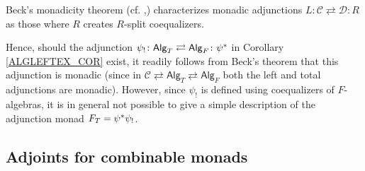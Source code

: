 \documentclass[a4paper,10pt
,draft
]{article}%
\renewcommand{\1}{\eta}%
\newcommand{\Alg}{\mathsf{Alg}}
\begin{document}


\begin{remark}\label{ADJSRMON REM}
Beck's monadicity theorem (cf. \cite[VI.7 Thm. 1]{McL},\cite[Thm. 5.5.1]{Ri17})
characterizes monadic adjunctions $L\colon \mathcal{C} \rightleftarrows \mathcal{D}\colon R$
as those where $R$ creates $R$-split coequalizers. 

Hence, should the adjunction 
$\psi_! \colon \Alg_T \rightleftarrows \Alg_F \colon \psi^{\**}$
in Corollary \ref{ALGLEFTEX_COR} exist,
it readily follows from Beck's theorem that this adjunction is monadic
(since in 
$\mathcal{C} \rightleftarrows
\mathsf{Alg}_T \rightleftarrows
\Alg_F$
both the left and total adjunctions are monadic).
However, since $\psi_!$ is defined using coequalizers of $F$-algebras,
it is in general not possible to give a simple description of the adjunction monad
$F_T = \psi^{\**} \psi_!$.
%
\end{remark}


\subsection{Adjoints for combinable monads}
\end{document}
